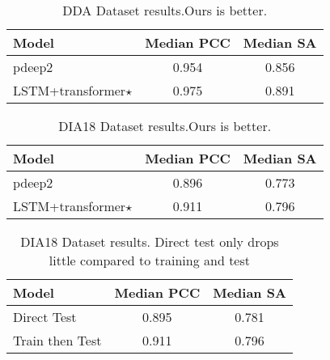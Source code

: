\begin{table}
   \begin{center}
   \begin{tabular}{|l|c|c|}
   \hline
   Model & Median PCC & Median SA \\
   \hline\hline
   pdeep2 & 0.954 & 0.856 \\
   LSTM+transformer$\star$ & 0.975 & 0.891 \\
   \hline
   \end{tabular}
   \end{center}
   \caption{DDA Dataset results.Ours is better.}
   \label{table:DDA}
   \end{table}

\begin{table}
   \begin{center}
   \begin{tabular}{|l|c|c|}
   \hline
   Model & Median PCC & Median SA \\
   \hline\hline
   pdeep2 & 0.896 & 0.773 \\
   LSTM+transformer$\star$ & 0.911 & 0.796 \\
   \hline
   \end{tabular}
   \end{center}
   \caption{DIA18 Dataset results.Ours is better.}
   \label{table:DIA18}
\end{table}

\begin{table}
   \begin{center}
   \begin{tabular}{|l|c|c|}
   \hline
   Model & Median PCC & Median SA \\
   \hline\hline
   Direct Test & 0.895 & 0.781 \\
   Train then Test & 0.911 & 0.796 \\
   \hline
   \end{tabular}
   \end{center}
   \caption{DIA18 Dataset results. Direct test only drops little compared to training and test}
   \label{table:DIA18_direct}
\end{table}
